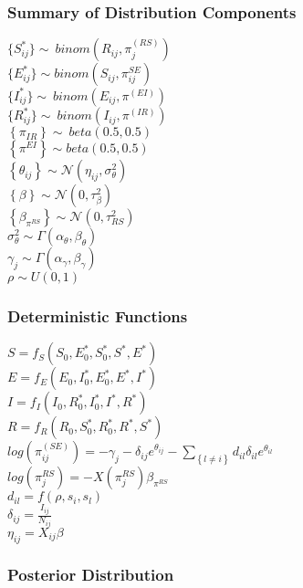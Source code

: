 \documentclass[12pt]{article}
\newcommand \noi {\noindent}
\newcommand \mbreak {\\ \vspace{0.1in}}
\begin{document}
\subsubsection{Summary of Distribution Components}
$\{S_{ij}^*\} \sim\  binom(R_{ij}, \pi_j^{(RS)})$\mbreak
$\{E_{ij}^*\} \sim binom(S_{ij}, \pi^{SE}_{ij})$ \mbreak
$\{I_{ij}^*\} \sim\  binom(E_{ij}, \pi^{(EI)})$\mbreak
$\{R_{ij}^*\} \sim\  binom(I_{ij}, \pi^{(IR)})$\mbreak
\noi
$\left\{\pi_{IR}  \right\} \sim\ beta(0.5, 0.5)$\mbreak 
$\left\{\pi^{EI}  \right\} \sim beta(0.5, 0.5)$\mbreak 
$\left\{ \theta_{ij}\right\} \sim \mathcal{N}(\eta_{ij}, \sigma^2_{\theta})$ \mbreak
$\left\{ \beta \right\} \sim \mathcal{N}(0, \tau^2_\beta) $\mbreak 
$\left\{ \beta_{\pi^{RS}} \right\} \sim \mathcal{N}(0, \tau^2_{RS}) $\mbreak 
$\sigma^2_{\theta} \sim \Gamma(\alpha_\theta, \beta_\theta)$\mbreak
$\gamma_j \sim \Gamma(\alpha_\gamma, \beta_\gamma)$\mbreak
$\rho \sim U(0,1)$

\subsubsection{Deterministic Functions}
$S = f_S(S_0, E^*_0, S^*_0, S^*, E^*)$ \mbreak
$E = f_E(E_0, I^*_0, E^*_0, E^*, I^*)$ \mbreak
$I = f_I(I_0, R^*_0, I^*_0, I^*, R^*)$ \mbreak
$R = f_R(R_0, S^*_0, R^*_0, R^*, S^*)$ \mbreak
$\displaystyle log(\pi^{(SE)}_{ij}) = -\gamma_j-\delta_{ij}e^{\theta_{ij}} - \sum_{\left\{ l \ne i \right\}}d_{il}\delta_{il}e^{\theta_{il}}$\mbreak
$log(\pi_j^{RS}) = -X(\pi_j^{RS}) \beta_{\pi^{RS}}$\mbreak
$d_{il} = f(\rho, s_i, s_l)$\mbreak
$\delta_{ij} = \frac{I_{ij}}{N_{ij}}$ \mbreak
$\eta_{ij} = X_{ij}\beta$
\subsubsection{Posterior Distribution}
\end{document}
